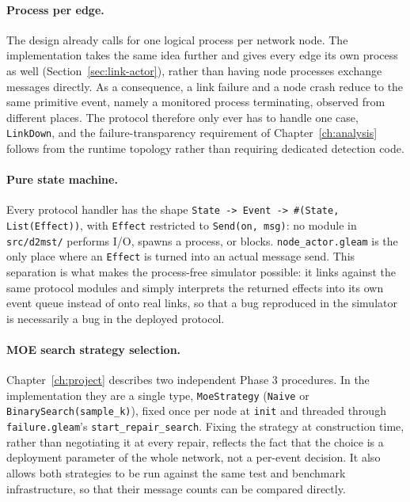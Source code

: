 \paragraph{Process per edge.}
The design already calls for one logical process per network node. The implementation
takes the same idea further and gives every edge its own process as well
(Section~\ref{sec:link-actor}), rather than having node processes exchange messages
directly. As a consequence, a link failure and a node crash reduce to the same primitive
event, namely a monitored process terminating, observed from different places. The
protocol therefore only ever has to handle one case, \texttt{LinkDown}, and the
failure-transparency requirement of Chapter~\ref{ch:analysis} follows from the runtime
topology rather than requiring dedicated detection code.

\paragraph{Pure state machine.}
Every protocol handler has the shape \texttt{State -> Event -> \#(State, List(Effect))},
with \texttt{Effect} restricted to \texttt{Send(on, msg)}: no module in
\texttt{src/d2mst/} performs I/O, spawns a process, or blocks. \texttt{node\_actor.gleam}
is the only place where an \texttt{Effect} is turned into an actual message send. This
separation is what makes the process-free simulator possible: it links against the same
protocol modules and simply interprets the returned effects into its own event queue
instead of onto real links, so that a bug reproduced in the simulator is necessarily a bug
in the deployed protocol.

\paragraph{MOE search strategy selection.}
Chapter~\ref{ch:project} describes two independent Phase 3 procedures. In the
implementation they are a single type, \texttt{MoeStrategy} (\texttt{Naive} or
\texttt{BinarySearch(sample\_k)}), fixed once per node at \texttt{init} and threaded
through \texttt{failure.gleam}'s \texttt{start\_repair\_search}. Fixing the strategy at
construction time, rather than negotiating it at every repair, reflects the fact that the
choice is a deployment parameter of the whole network, not a per-event decision. It also
allows both strategies to be run against the same test and benchmark infrastructure, so
that their message counts can be compared directly.


